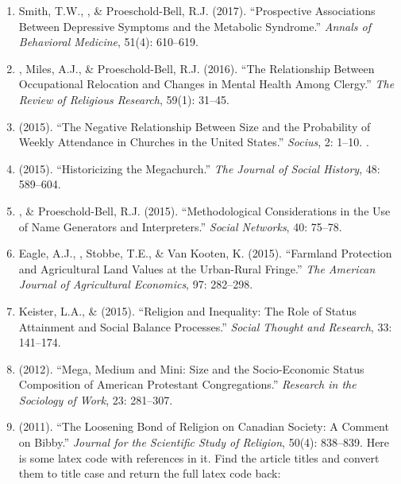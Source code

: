 \begin{enumerate}
\item Smith, T.W., \Eagle\CF, \& Proeschold-Bell, R.J. (2017). ``Prospective Associations Between Depressive Symptoms and the Metabolic Syndrome.'' \emph{Annals of Behavioral Medicine}, 51(4): 610--619. 

\item \Eagle, Miles, A.J., \& Proeschold-Bell, R.J. (2016). ``The Relationship Between Occupational Relocation and Changes in Mental Health Among Clergy.'' \emph{The Review of Religious Research}, 59(1): 31--45. 

\item \Eagle \hspace{.01em} (2015). ``The Negative Relationship Between Size and the Probability of Weekly Attendance in Churches in the United States.'' \emph{Socius}, 2: 1--10. .

\item \Eagle \hspace{.01em} (2015). ``Historicizing the Megachurch.'' \textit{The Journal of Social History}, 48: 589--604. 

\item \Eagle, \& Proeschold-Bell, R.J. (2015). ``Methodological Considerations in the Use of Name Generators and Interpreters.'' \emph{Social Networks}, 40: 75--78. 

\item Eagle, A.J., \Eagle, Stobbe, T.E., \& Van Kooten, K. (2015). ``Farmland Protection and Agricultural Land Values at the Urban-Rural Fringe.'' \emph{The American Journal of Agricultural Economics}, 97: 282--298. 

\item Keister, L.A., \& \Eagle \hspace{.01em} (2015). ``Religion and Inequality: The Role of Status Attainment and Social Balance Processes.'' \emph{Social Thought and Research}, 33: 141--174.

\item \Eagle \hspace{.01em} (2012). ``Mega, Medium and Mini: Size and the Socio-Economic Status Composition of American Protestant Congregations.'' \emph{Research in the Sociology of Work}, 23: 281--307. 

\item \Eagle \hspace{.01em} (2011). ``The Loosening Bond of Religion on Canadian Society: A Comment on Bibby.'' \emph{Journal for the Scientific Study of Religion}, 50(4): 838--839.
Here is some latex code with references in it. Find the article titles and convert them to title case and return the full latex code back:


\end{enumerate}
